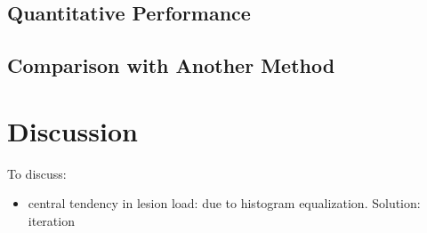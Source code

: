 \subsection{Quantitative Performance}
\subsection{Comparison with Another Method}
\section{Discussion}
To discuss:
\begin{itemize}
  \item central tendency in lesion load: due to histogram equalization. Solution: iteration
\end{itemize}



%
